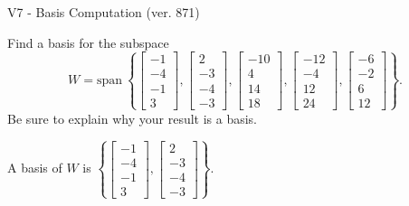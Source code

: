 \begin{exercise}
  \begin{exerciseTitle}V7 - Basis Computation (ver. 871)\end{exerciseTitle}
  \begin{exerciseStatement}
    Find a basis for the subspace 
\[W=\mathrm{span}\ \left\{\left[\begin{array}{r}
-1 \\
-4 \\
-1 \\
3
\end{array}\right] , \left[\begin{array}{r}
2 \\
-3 \\
-4 \\
-3
\end{array}\right] , \left[\begin{array}{r}
-10 \\
4 \\
14 \\
18
\end{array}\right] , \left[\begin{array}{r}
-12 \\
-4 \\
12 \\
24
\end{array}\right] , \left[\begin{array}{r}
-6 \\
-2 \\
6 \\
12
\end{array}\right]\right\}.\]
 Be sure to explain why your result is a basis.


  \end{exerciseStatement}
  \begin{exerciseAnswer}
   A basis of \(W\) is  \(\left\{\left[\begin{array}{r}
-1 \\
-4 \\
-1 \\
3
\end{array}\right] , \left[\begin{array}{r}
2 \\
-3 \\
-4 \\
-3
\end{array}\right]\right\}\).
  


  \end{exerciseAnswer}
\end{exercise}